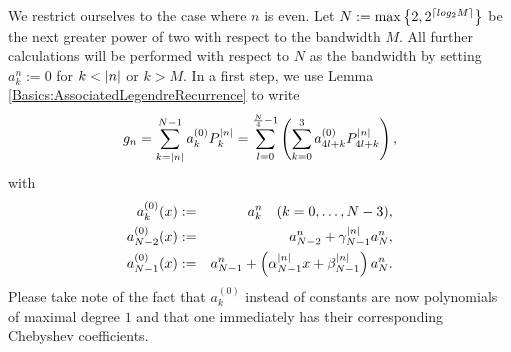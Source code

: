We restrict ourselves to the case where $n$ is even. Let $N := \max \left\{2,2^{\left\lceil log_2 M\right\rceil}\right\rbrace$ be the next greater 
power of two with respect to the bandwidth $M$. All further calculations will be performed with respect to $N$ as the 
bandwidth by setting $a_k^n := 0$ for $k < \left\vert n\right\vert$ or $k > M$. In a first step, we use Lemma 
\ref{Basics:AssociatedLegendreRecurrence} to write
$$ g_n = \sum_{k = \left\vert n\right\vert}^{N-1} a_{k}^{(0)} P_k^{\left\vert n\right\vert} = \sum_{l = 0}^{\frac{N}{4}-1} \left(\sum_{k = 0}^3 a_{4l+k}^{(0)}P_{4l+k}^{\left\vert n\right\vert}\right),$$
with
\begin{eqnarray*}
  a_k^{(0)}{\hspace{-0.4ex}}\left(x\right)        & := & a_k^n \quad (k = 0,\ldots,N-3),\\
  a_{N-2}^{(0)}{\hspace{-0.4ex}}\left(x\right) & := & a_{N-2}^n + \gamma_{N-1}^{\left\vert n\right\vert} a_N^n,\\
  a_{N-1}^{(0)}{\hspace{-0.4ex}}\left(x\right) & := & a_{N-1}^n + \left(\alpha_{N-1}^{\left\vert n\right\vert}x + \beta_{N-1}^{\left\vert n\right\vert}\right) a_N^n.
\end{eqnarray*}
Please take note of the fact that $a_k^{(0)}$  instead of constants are now polynomials of 
maximal degree $1$ and that one immediately has their corresponding Chebyshev coefficients.

